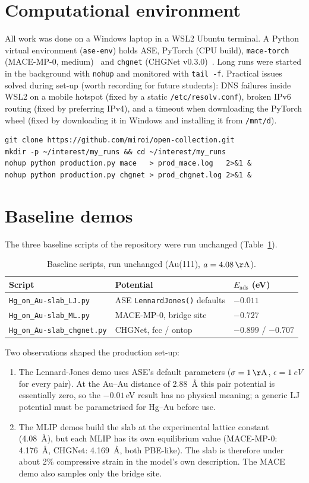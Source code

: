 \documentclass[11pt,a4paper]{article}
\begin{document}
\section{Computational environment}
All work was done on a Windows laptop in a WSL2 Ubuntu terminal. A Python virtual environment
(\texttt{ase-env}) holds ASE, PyTorch (CPU build), \texttt{mace-torch} (MACE-MP-0, medium)~\cite{mace} and
\texttt{chgnet} (CHGNet v0.3.0)~\cite{chgnet}. Long runs were started in the background with \texttt{nohup} and
monitored with \texttt{tail -f}. Practical issues solved during set-up (worth recording for future students):
DNS failures inside WSL2 on a mobile hotspot (fixed by a static \texttt{/etc/resolv.conf}), broken IPv6 routing
(fixed by preferring IPv4), and a timeout when downloading the PyTorch wheel (fixed by downloading it in Windows
and installing it from \texttt{/mnt/d}).
\begin{lstlisting}
git clone https://github.com/miroi/open-collection.git
mkdir -p ~/interest/my_runs && cd ~/interest/my_runs
nohup python production.py mace   > prod_mace.log   2>&1 &
nohup python production.py chgnet > prod_chgnet.log 2>&1 &
\end{lstlisting}

\section{Baseline demos}
The three baseline scripts of the repository were run unchanged (Table~\ref{tab:baseline}).
\begin{table}[h]\centering
\caption{Baseline scripts, run unchanged (Au(111), $a=\SI{4.08}{\AA}$).}\label{tab:baseline}
\begin{tabular}{lll}\toprule
Script & Potential & $E_\mathrm{ads}$ (eV)\\\midrule
\texttt{Hg\_on\_Au-slab\_LJ.py} & ASE \texttt{LennardJones()} defaults & $-0.011$\\
\texttt{Hg\_on\_Au-slab\_ML.py} & MACE-MP-0, bridge site & $-0.727$\\
\texttt{Hg\_on\_Au-slab\_chgnet.py} & CHGNet, fcc / ontop & $-0.899$ / $-0.707$\\\bottomrule
\end{tabular}\end{table}

Two observations shaped the production set-up:
\begin{enumerate}
\item The Lennard-Jones demo uses ASE's default parameters ($\sigma=\SI{1}{\AA}$, $\epsilon=\SI{1}{eV}$ for
every pair). At the Au--Au distance of \SI{2.88}{\AA} this pair potential is essentially zero, so the
$-0.01$\,eV result has no physical meaning; a generic LJ potential must be parametrised for Hg--Au before use.
\item The MLIP demos build the slab at the experimental lattice constant (\SI{4.08}{\AA}), but each MLIP has
its own equilibrium value (MACE-MP-0: \SI{4.176}{\AA}, CHGNet: \SI{4.169}{\AA}, both PBE-like). The slab is
therefore under about 2\% compressive strain in the model's own description. The MACE demo also samples only the
bridge site.
\end{enumerate}
\end{document}
